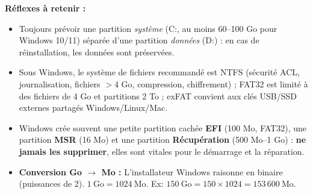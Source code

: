 \documentclass[11pt]{article}
\newcommand{\cle}[1]{{\popxbold\color{popdark}#1}}
\begin{document}
\begin{methode}
\textbf{Réflexes à retenir :}
\begin{itemize}
  \item Toujours prévoir une partition \emph{système} (C:, au moins 60--100 Go pour Windows 10/11) séparée d'une partition \emph{données} (D:) : en cas de réinstallation, les données sont préservées.
  \item Sous Windows, le système de fichiers recommandé est \cle{NTFS} (sécurité ACL, journalisation, fichiers $> 4$ Go, compression, chiffrement) ; \cle{FAT32} est limité à des fichiers de 4 Go et partitions 2 To ; \cle{exFAT} convient aux clés USB/SSD externes partagés Windows/Linux/Mac.
  \item Windows crée souvent une petite partition cachée \textbf{EFI} (100 Mo, FAT32), une partition \textbf{MSR} (16 Mo) et une partition \textbf{Récupération} (500 Mo--1 Go) : \textbf{ne jamais les supprimer}, elles sont vitales pour le démarrage et la réparation.
  \item \textbf{Conversion Go $\rightarrow$ Mo :} L'installateur Windows raisonne en binaire (puissances de 2). $1~\text{Go} = 1024~\text{Mo}$. Ex: $150~\text{Go} = 150 \times 1024 = 153\,600~\text{Mo}$.
\end{itemize}
\end{methode}
\end{document}
